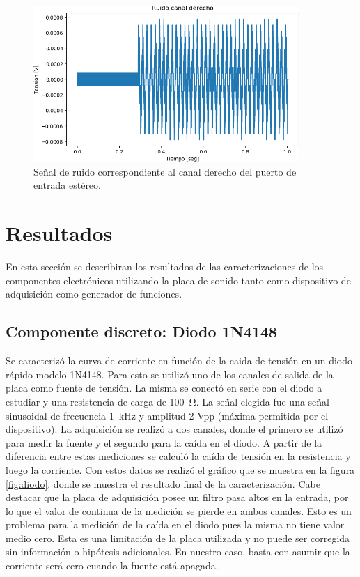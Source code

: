 \documentclass[a4paper,11pt]{article}
\begin{document}
	\begin{figure}[h]
		\centering
		\includegraphics[width=0.9\textwidth]{imagenes/RuidoCanalDerecho.png}
		\caption{Señal de ruido correspondiente al canal derecho del
puerto de entrada estéreo.}
        \label{fig:RuidoDerecho}
	\end{figure}
\clearpage

\section{Resultados}
\label{sec:resultados}

En esta sección se describiran los resultados de las caracterizaciones de los componentes electrónicos utilizando la placa de sonido tanto como dispositivo de adquisición como generador de funciones. 
	\subsection{Componente discreto: Diodo 1N4148}
	\label{sec:discreto}
	Se caracterizó la curva de corriente en función de la caida de tensión en un diodo rápido modelo 1N4148. Para esto se utilizó uno de los canales de salida de la placa como fuente de tensión. La misma se conectó en serie con el diodo a estudiar y una resistencia de carga de \SI{100}{\ohm}. La señal elegida fue una señal sinusoidal de frecuencia \SI{1}{\kilo\hertz} y amplitud 2 Vpp (máxima permitida por el dispositivo). La adquisición se realizó a dos canales, donde el primero se utilizó para medir la fuente y el segundo para la caída en el diodo. A partir de la diferencia entre estas mediciones se calculó la caída de tensión en la resistencia y luego la corriente. Con estos datos se realizó el gráfico que se muestra en la figura \ref{fig:diodo}, donde se muestra el resultado final de la caracterización. Cabe destacar que la placa de adquisición posee un filtro pasa altos en la entrada, por lo que el valor de continua de la medición se pierde en ambos canales. Esto es un problema para la medición de la caída en el diodo pues la misma no tiene valor medio cero. Esta es una limitación de la placa utilizada y no puede ser corregida sin información o hipótesis adicionales. En nuestro caso, basta con asumir que la corriente será cero cuando la fuente está apagada.   
	
\end{document}
